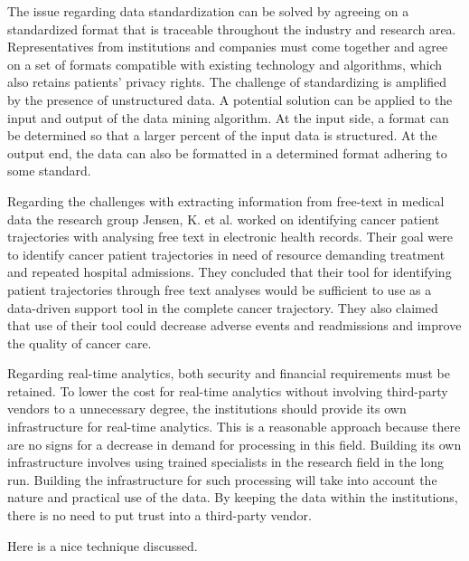The issue regarding data standardization can be solved by agreeing on a standardized format that is traceable throughout the industry and research area. Representatives from institutions and companies must come together and agree on a set of formats compatible with existing technology and algorithms, which also retains patients’ privacy rights. The challenge of standardizing is amplified by the presence of unstructured data. A potential solution can be applied to the input and output of the data mining algorithm. At the input side, a format can be determined so that a larger percent of the input data is structured. At the output end, the data can also be formatted in a determined format adhering to some standard.

Regarding the challenges with extracting information from free-text in medical data the research group Jensen, K. et al.\cite{freetext} worked on identifying cancer patient trajectories with analysing free text in electronic health records. Their goal were to identify cancer patient trajectories in need of resource demanding treatment and repeated hospital admissions. They concluded that their tool for identifying patient trajectories through free text analyses would be sufficient to use as a data-driven support tool in the complete cancer trajectory. They also claimed that use of their tool could decrease adverse events and readmissions and improve the quality of cancer care. 

Regarding real-time analytics, both security and financial requirements must be retained. To lower the cost for real-time analytics without involving third-party vendors to a unnecessary degree, the institutions should provide its own infrastructure for real-time analytics. This is a reasonable approach because there are no signs for a decrease in demand for processing in this field. Building its own infrastructure involves using trained specialists in the research field in the long run. Building the infrastructure for such processing will take into account the nature and practical use of the data. By keeping the data within the institutions, there is no need to put trust into a third-party vendor.

Here is a nice technique discussed.\cite{medicalmining}

